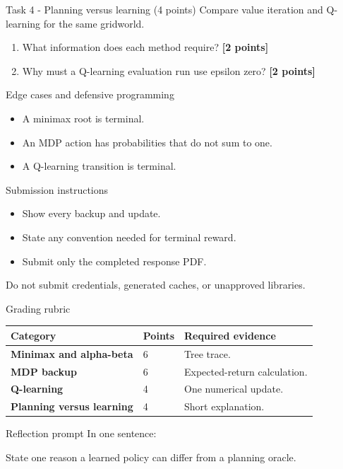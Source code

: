 \documentclass[aspectratio=169,11pt]{beamer}
\begin{document}
\begin{frame}{Task 4 - Planning versus learning (4 points)}
\small
Compare value iteration and Q-learning for the same gridworld.

\vspace{0.2cm}
\begin{enumerate}
\item[\textbf{a.}] What information does each method require? \hfill{\color{courseblue}\textbf{[2 points]}}
\item[\textbf{b.}] Why must a Q-learning evaluation run use epsilon zero? \hfill{\color{courseblue}\textbf{[2 points]}}
\end{enumerate}
\end{frame}

\begin{frame}{Edge cases and defensive programming}
\small
\begin{itemize}
  \item A minimax root is terminal.
  \item An MDP action has probabilities that do not sum to one.
  \item A Q-learning transition is terminal.
\end{itemize}
\end{frame}

\begin{frame}{Submission instructions}
\small
\begin{itemize}
  \item Show every backup and update.
  \item State any convention needed for terminal reward.
  \item Submit only the completed response PDF.
\end{itemize}
\vspace{0.2cm}
\alert{Do not submit credentials, generated caches, or unapproved libraries.}
\end{frame}

\begin{frame}{Grading rubric}
\scriptsize
\begin{tabularx}{\textwidth}{>{\bfseries}p{} p{} X}
\toprule
Category & Points & Required evidence \\
\midrule
Minimax and alpha-beta & 6 & Tree trace. \\
MDP backup & 6 & Expected-return calculation. \\
Q-learning & 4 & One numerical update. \\
Planning versus learning & 4 & Short explanation. \\
\bottomrule
\end{tabularx}
\end{frame}

\begin{frame}{Reflection prompt}
In one sentence:

State one reason a learned policy can differ from a planning oracle.
\end{frame}
\end{document}
